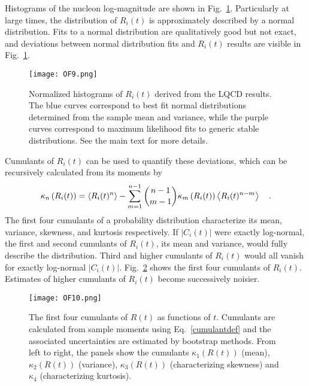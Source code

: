 Histograms of the nucleon log-magnitude are shown in Fig.~\ref{RHistograms}. 
Particularly at large times, the distribution of $R_i(t)$ is approximately described by a normal distribution. 
Fits to a normal distribution are qualitatively good but not exact, and  deviations between normal distribution fits 
and $R_i(t)$ results are  visible in Fig.~\ref{RHistograms}. 
%
\begin{figure}[!ht]
  \centering
  \texttt{[image: OF9.png]}
  \caption{
  Normalized histograms of $R_i(t)$ derived from the LQCD results. 
  The blue curves correspond to  best fit normal distributions  determined from the sample mean and variance,
  while the purple curves correspond to 
  maximum likelihood fits to generic stable distributions. 
  See the main text for more details.
  }
  \label{RHistograms}
\end{figure}
%
Cumulants of $R_i(t)$ can be used to quantify these deviations, which can be  recursively calculated  from its moments by
%
\begin{equation}
  \begin{split}
    \kappa_n\left( R_i(t) \right) = \left< R_i(t)^n \right> - \sum_{m=1}^{n-1} {{n-1}\choose{m-1}} \kappa_m\left( R_i(t) \right)\left< R_i(t)^{n-m} \right>
    \ \ \  .
  \end{split}\label{cumulantdef}
\end{equation}
%
The first four cumulants of a probability distribution characterize its mean, variance, skewness, and kurtosis respectively. 
If $|C_i(t)|$ were exactly log-normal, the first and second cumulants of $R_i(t)$, its mean and variance, would fully describe the distribution. 
Third and higher cumulants of $R_i(t)$ would all vanish for exactly log-normal $|C_i(t)|$. 
Fig.~\ref{RCumulants} shows the first four cumulants of $R_i(t)$. 
Estimates of higher cumulants of $R_i(t)$ become successively noisier.
%
\begin{figure}[!ht]
  \centering
  \texttt{[image: OF10.png]}
  \caption{
  The first four cumulants of $R(t)$ as functions of $t$. Cumulants are calculated from sample moments using Eq.~\eqref{cumulantdef} 
  and the associated uncertainties are estimated by bootstrap methods. 
  From left to right, the panels show the cumulants 
   $\kappa_1(R(t))$ (mean),  $\kappa_2(R(t))$  (variance),   $\kappa_3(R(t))$  (characterizing skewness) and $\kappa_4$ (characterizing kurtosis).
  }
  \label{RCumulants}
\end{figure}
%



